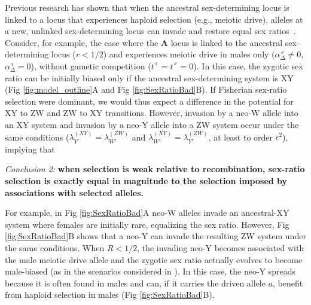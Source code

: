 \documentclass[10pt,letterpaper]{article}
\begin{document}
Previous research has shown that when the ancestral sex-determining locus is linked to a locus that experiences haploid selection (e.g., meiotic drive), alleles at a new, unlinked sex-determining locus can invade and restore equal sex ratios~\cite{Kozielska:2010vm}. 
Consider, for example, the case where the $\mathbf{A}$ locus is linked to the ancestral sex-determining locus ($r<1/2$) and experiences meiotic drive in males only ($\alpha^\male_\Delta \neq 0$, $\alpha^\female_\Delta=0$), without gametic competition ($t^\female=t^\male=0$).
In this case, the zygotic sex ratio can be initially biased only if the ancestral sex-determining system is XY (Fig \ref{fig:model_outline}A and Fig \ref{fig:SexRatioBad}B). 
If Fisherian sex-ratio selection were dominant, we would thus expect a difference in the potential for XY to ZW and ZW to XY transitions. 
However, invasion by a neo-W allele into an XY system and invasion by a neo-Y allele into a ZW system occur under the same conditions ($\lambda_{Y'}^{(XY)} = \lambda_{W'}^{(ZW)}$ and $\lambda_{W'}^{(XY)}=\lambda_{Y'}^{(ZW)}$, at least to order $\epsilon^2$), implying that
\vspace{0.5cm}

\noindent\textit{Conclusion 2:}
\textbf{when selection is weak relative to recombination, sex-ratio selection is exactly equal in magnitude to the selection imposed by associations with selected alleles.}
\vspace{0.5cm}

\noindent For example, in Fig \ref{fig:SexRatioBad}A neo-W alleles invade an ancestral-XY system where females are initially rare, equalizing the sex ratio.
However, Fig \ref{fig:SexRatioBad}B shows that a neo-Y can invade the resulting ZW system under the same conditions. 
When $R<1/2$, the invading neo-Y becomes associated with the male meiotic drive allele and the zygotic sex ratio actually evolves to become male-biased (as in the scenarios considered in \cite{Kozielska:2010vm,Ubeda:2015fx}).
In this case, the neo-Y spreads because it is often found in males and can, if it carries the driven allele $a$, benefit from haploid selection in males (Fig \ref{fig:SexRatioBad}B).
\end{document}
